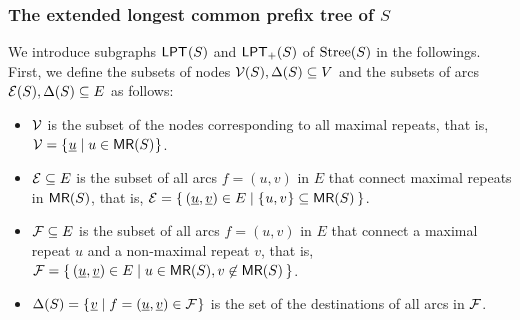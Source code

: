 \documentclass{article}
\begin{document}


\subsubsection{The extended longest common prefix tree of $S$}
We introduce subgraphs $\LPT(S)$ and $\LPT[+](S)$ of $\Stree(S)$ in the followings. First, we define the subsets of nodes $\sig V(S), \Delta(S) \subseteq V$ and the subsets  of arcs $\sig E(S), \Delta(S)\subseteq E$ as follows: 
\begin{itemize}
\item $\sig V$ is the subset of the nodes corresponding to all maximal repeats, that is, $\sig V = \set{ \underline u \mid u \in \MR(S) }$. 
  
\item $\sig E \subseteq E$ is the subset of all arcs $f = (u, v)$ in $E$ that connect maximal repeats in $\MR(S)$, that is, $\sig E = \sete{ (\underline u, \underline v) \in E \mid \set{u, v} \subseteq \MR(S) }$.

\item $\sig F\subseteq E$ is the subset of all arcs $f = (u, v)$ in $E$ that connect a maximal repeat $u$ and a non-maximal repeat $v$, that is, $\sig F = \sete{ (\underline u, \underline v) \in E \mid u \in \MR(S), v \not\in \MR(S) }$.  
  
\item $\Delta(S) = \set{ \underline v \mid f = (\underline u, \underline v) \in \sig F }$ is the set of the destinations of all arcs in $\sig F$.
\end{itemize}
\end{document}
